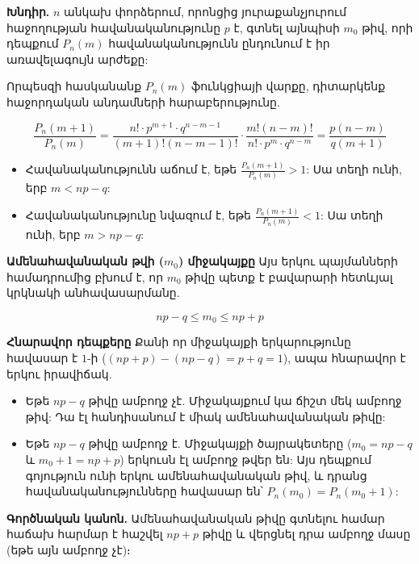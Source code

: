 \documentclass[12pt, a4paper]{article}
\begin{document}
\textbf{Խնդիր.} $n$ անկախ փորձերում, որոնցից յուրաքանչյուրում հաջողության հավանականությունը $p$ է, գտնել այնպիսի $m_0$ թիվ, որի դեպքում $P_n(m)$ հավանականությունն ընդունում է իր առավելագույն արժեքը:

Որպեսզի հասկանանք $P_n(m)$ ֆունկցիայի վարքը, դիտարկենք հաջորդական անդամների հարաբերությունը.

$$\frac{P_n(m+1)}{P_n(m)} = \frac{n! \cdot p^{m+1} \cdot q^{n-m-1}}{(m+1)!(n-m-1)!} \cdot \frac{m!(n-m)!}{n! \cdot p^m \cdot q^{n-m}} = \frac{p(n-m)}{q(m+1)}$$

\begin{itemize}
    \item Հավանականությունն աճում է, եթե $\frac{P_n(m+1)}{P_n(m)} > 1$: Սա տեղի ունի, երբ $m < np - q$:
    \item Հավանականությունը նվազում է, եթե $\frac{P_n(m+1)}{P_n(m)} < 1$: Սա տեղի ունի, երբ $m > np - q$:
\end{itemize}

\textbf{Ամենահավանական թվի ($m_0$) միջակայքը}
Այս երկու պայմանների համադրումից բխում է, որ $m_0$ թիվը պետք է բավարարի հետևյալ կրկնակի անհավասարմանը.

$$np - q \leq m_0 \leq np + p$$

\textbf{Հնարավոր դեպքերը}
Քանի որ միջակայքի երկարությունը հավասար է $1$-ի ($(np+p) - (np-q) = p+q = 1$), ապա հնարավոր է երկու իրավիճակ.

\begin{itemize}
    \item Եթե $np-q$ թիվը ամբողջ չէ. Միջակայքում կա ճիշտ մեկ ամբողջ թիվ: Դա էլ հանդիսանում է միակ ամենահավանական թիվը:
    \item Եթե $np-q$ թիվը ամբողջ է. Միջակայքի ծայրակետերը ($m_0 = np-q$ և $m_0+1 = np+p$) երկուսն էլ ամբողջ թվեր են: Այս դեպքում գոյություն ունի երկու ամենահավանական թիվ, և դրանց հավանականությունները հավասար են՝ $P_n(m_0) = P_n(m_0+1)$:
\end{itemize}

\textbf{Գործնական կանոն.} Ամենահավանական թիվը գտնելու համար հաճախ հարմար է հաշվել $np+p$ թիվը և վերցնել դրա ամբողջ մասը (եթե այն ամբողջ չէ)։
\end{document}
